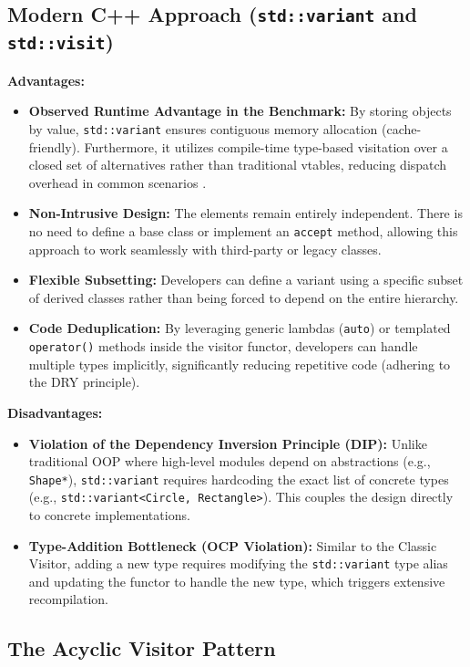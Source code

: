 \subsection{Modern C++ Approach (\texttt{std::variant} and \texttt{std::visit})}

\textbf{Advantages:}
\begin{itemize}
    \item \textbf{Observed Runtime Advantage in the Benchmark:} By storing objects by value, \texttt{std::variant} ensures contiguous memory allocation (cache-friendly). Furthermore, it utilizes compile-time type-based visitation over a closed set of alternatives rather than traditional vtables, reducing dispatch overhead in common scenarios \cite{cpprefvariant,cpprefvisit}.
    \item \textbf{Non-Intrusive Design:} The elements remain entirely independent. There is no need to define a base class or implement an \texttt{accept} method, allowing this approach to work seamlessly with third-party or legacy classes.
    \item \textbf{Flexible Subsetting:} Developers can define a variant using a specific subset of derived classes rather than being forced to depend on the entire hierarchy.
    \item \textbf{Code Deduplication:} By leveraging generic lambdas (\texttt{auto}) or templated \texttt{operator()} methods inside the visitor functor, developers can handle multiple types implicitly, significantly reducing repetitive code (adhering to the DRY principle).
\end{itemize}

\textbf{Disadvantages:}
\begin{itemize}
    \item \textbf{Violation of the Dependency Inversion Principle (DIP):} Unlike traditional OOP where high-level modules depend on abstractions (e.g., \texttt{Shape*}), \texttt{std::variant} requires hardcoding the exact list of concrete types (e.g., \texttt{std::variant<Circle, Rectangle>}). This couples the design directly to concrete implementations.
    \item \textbf{Type-Addition Bottleneck (OCP Violation):} Similar to the Classic Visitor, adding a new type requires modifying the \texttt{std::variant} type alias and updating the functor to handle the new type, which triggers extensive recompilation.
\end{itemize}


\subsection{The Acyclic Visitor Pattern}

